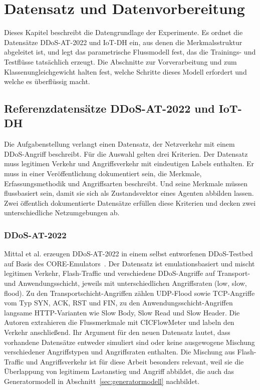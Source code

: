 \chapter{Datensatz und Datenvorbereitung}
\label{chap:datensatz}

Dieses Kapitel beschreibt die Datengrundlage der Experimente. Es ordnet die Datensätze \mbox{DDoS-AT-2022} und \mbox{IoT-DH} ein, aus denen die Merkmalsstruktur abgeleitet ist, und legt das parametrische Flussmodell fest, das die Trainings- und Testflüsse tatsächlich erzeugt. Die Abschnitte zur Vorverarbeitung und zum Klassenungleichgewicht halten fest, welche Schritte dieses Modell erfordert und welche es überflüssig macht.

\section{Referenzdatensätze \mbox{DDoS-AT-2022} und \mbox{IoT-DH}}
\label{sec:datensaetze}

Die Aufgabenstellung verlangt einen Datensatz, der Netzverkehr mit einem DDoS-Angriff beschreibt. Für die Auswahl gelten drei Kriterien. Der Datensatz muss legitimen Verkehr und Angriffsverkehr mit eindeutigen Labels enthalten. Er muss in einer Veröffentlichung dokumentiert sein, die Merkmale, Erfassungsmethodik und Angriffsarten beschreibt. Und seine Merkmale müssen flussbasiert sein, damit sie sich als Zustandsvektor eines Agenten abbilden lassen. Zwei öffentlich dokumentierte Datensätze erfüllen diese Kriterien und decken zwei unterschiedliche Netzumgebungen ab.

\subsection*{\mbox{DDoS-AT-2022}}

Mittal et al. erzeugen \mbox{DDoS-AT-2022} in einem selbst entworfenen DDoS-Testbed auf Basis des CORE-Emulators~\autocite{mittalDDoSAT2022DistributedDenial2023}. Der Datensatz ist emulationsbasiert und mischt legitimen Verkehr, Flash-Traffic und verschiedene DDoS-Angriffe auf Transport- und Anwendungsschicht, jeweils mit unterschiedlichen Angriffsraten (low, slow, flood). Zu den Transportschicht-Angriffen zählen UDP-Flood sowie TCP-Angriffe vom Typ SYN, ACK, RST und FIN, zu den Anwendungsschicht-Angriffen langsame HTTP-Varianten wie Slow Body, Slow Read und Slow Header. Die Autoren extrahieren die Flussmerkmale mit CICFlowMeter und labeln den Verkehr anschließend. Ihr Argument für den neuen Datensatz lautet, dass vorhandene Datensätze entweder simuliert sind oder keine ausgewogene Mischung verschiedener Angriffstypen und Angriffsraten enthalten. Die Mischung aus Flash-Traffic und Angriffsverkehr ist für diese Arbeit besonders relevant, weil sie die Überlappung von legitimem Lastanstieg und Angriff abbildet, die auch das Generatormodell in Abschnitt~\ref{sec:generatormodell} nachbildet.

